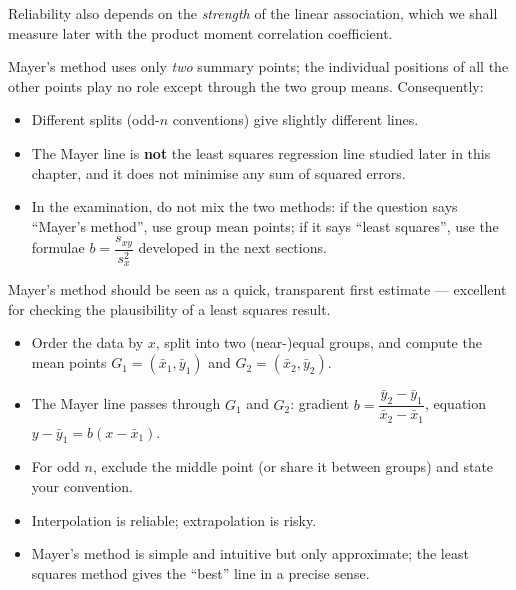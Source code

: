 \documentclass[11pt]{article}
\begin{document}
Reliability also depends on the \emph{strength} of the linear association, which we shall measure later with the product moment correlation coefficient.

\begin{attention}
Mayer's method uses only \emph{two} summary points; the individual positions of all the other points play no role except through the two group means. Consequently:
\begin{itemize}
\item Different splits (odd-$n$ conventions) give slightly different lines.
\item The Mayer line is \textbf{not} the least squares regression line studied later in this chapter, and it does not minimise any sum of squared errors.
\item In the examination, do not mix the two methods: if the question says ``Mayer's method'', use group mean points; if it says ``least squares'', use the formulae $b=\dfrac{s_{xy}}{s_x^2}$ developed in the next sections.
\end{itemize}
Mayer's method should be seen as a quick, transparent first estimate --- excellent for checking the plausibility of a least squares result.
\end{attention}

\begin{aretenir}
\begin{itemize}
\item Order the data by $x$, split into two (near-)equal groups, and compute the mean points $G_1=(\bar{x}_1,\bar{y}_1)$ and $G_2=(\bar{x}_2,\bar{y}_2)$.
\item The Mayer line passes through $G_1$ and $G_2$: gradient $b=\dfrac{\bar{y}_2-\bar{y}_1}{\bar{x}_2-\bar{x}_1}$, equation $y-\bar{y}_1=b(x-\bar{x}_1)$.
\item For odd $n$, exclude the middle point (or share it between groups) and state your convention.
\item Interpolation is reliable; extrapolation is risky.
\item Mayer's method is simple and intuitive but only approximate; the least squares method gives the ``best'' line in a precise sense.
\end{itemize}
\end{aretenir}
\end{document}

